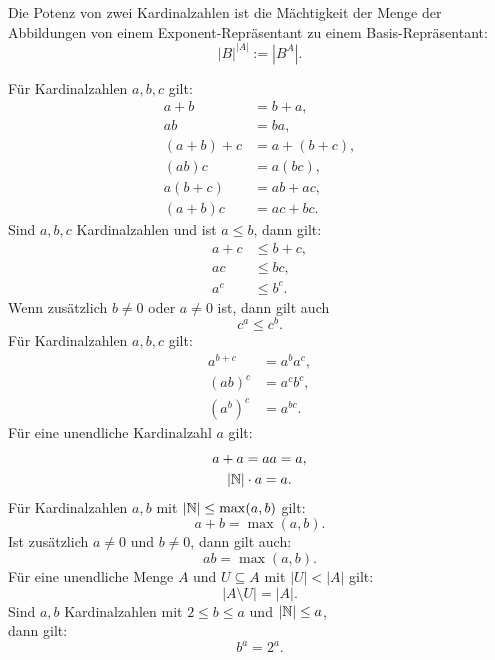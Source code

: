 \begin{definition}\mbox{}\newline
Die Potenz von zwei Kardinalzahlen ist die Mächtigkeit
der Menge der Abbildungen von einem Exponent-Repräsentant
zu einem Basis-Repräsentant:%
\begin{equation}
|B|^{|A|} := |B^A|.
\end{equation}
\end{definition}
Für Kardinalzahlen $a,b,c$ gilt:
\begin{align}
a+b &= b+a,\\
ab &= ba,\\
(a+b)+c &= a+(b+c),\\
(ab)c &= a(bc),\\
a(b+c) &= ab+ac,\\
(a+b)c &= ac+bc.
\end{align}
Sind $a,b,c$ Kardinalzahlen und ist $a\le b$, dann gilt:
\begin{align}
a+c &\le b+c,\\
ac &\le bc,\\
a^c &\le b^c.
\end{align}
Wenn zusätzlich $b\ne 0$ oder $a\ne 0$ ist, dann gilt auch
\begin{equation}
c^a \le c^b.
\end{equation}
Für Kardinalzahlen $a,b,c$ gilt:
\begin{align}
a^{b+c} &= a^b a^c,\\
(ab)^c &= a^c b^c,\\
(a^b)^c &= a^{bc}.
\end{align}
Für eine unendliche Kardinalzahl $a$ gilt:
\begin{gather}
a+a = aa = a,\\
|\mathbb N|\cdot a = a.
\end{gather}
Für Kardinalzahlen $a,b$ mit $|\mathbb N|\le\max(a,b)$ gilt:
\begin{equation}
a+b = \max(a,b).
\end{equation}
Ist zusätzlich $a\ne 0$ und $b\ne 0$, dann gilt auch:
\begin{equation}
ab = \max(a,b).
\end{equation}
Für eine unendliche Menge $A$ und $U\subseteq A$ mit $|U|<|A|$ gilt:
\begin{equation}
|A\setminus U| = |A|.
\end{equation}
Sind $a,b$ Kardinalzahlen mit $2\le b\le a$ und $|\mathbb N|\le a$,\\
dann gilt:
\begin{equation}
b^a = 2^a.
\end{equation}

